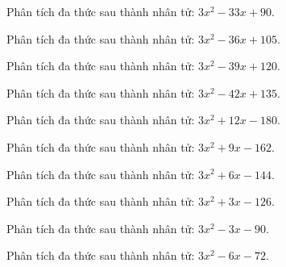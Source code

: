 \begin{bt}
	Phân tích đa thức sau thành nhân tử: $3 x^2 - 33 x + 90$.
\end{bt}
\begin{bt}
	Phân tích đa thức sau thành nhân tử: $3 x^2 - 36 x + 105$.
\end{bt}
\begin{bt}
	Phân tích đa thức sau thành nhân tử: $3 x^2 - 39 x + 120$.
\end{bt}
\begin{bt}
	Phân tích đa thức sau thành nhân tử: $3 x^2 - 42 x + 135$.
\end{bt}
\begin{bt}
	Phân tích đa thức sau thành nhân tử: $3 x^2 + 12 x - 180$.
\end{bt}
\begin{bt}
	Phân tích đa thức sau thành nhân tử: $3 x^2 + 9 x - 162$.
\end{bt}
\begin{bt}
	Phân tích đa thức sau thành nhân tử: $3 x^2 + 6 x - 144$.
\end{bt}
\begin{bt}
	Phân tích đa thức sau thành nhân tử: $3 x^2 + 3 x - 126$.
\end{bt}
\begin{bt}
	Phân tích đa thức sau thành nhân tử: $3 x^2 - 3 x - 90$.
\end{bt}
\begin{bt}
	Phân tích đa thức sau thành nhân tử: $3 x^2 - 6 x - 72$.
\end{bt}
